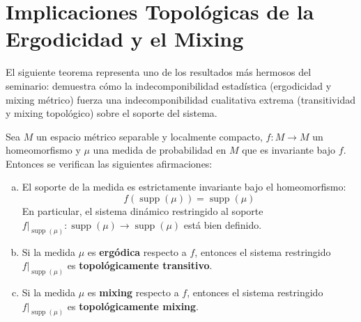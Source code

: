 \section{Implicaciones Topológicas de la Ergodicidad y el Mixing}

El siguiente teorema representa uno de los resultados más hermosos del seminario: demuestra cómo la indecomponibilidad estadística (ergodicidad y mixing métrico) fuerza una indecomponibilidad cualitativa extrema (transitividad y mixing topológico) sobre el soporte del sistema.

\begin{proposicion} \label{prop:dinamica_soporte}
	Sea $M$ un espacio métrico separable y localmente compacto, $f: M \to M$ un homeomorfismo y $\mu$ una medida de probabilidad en $M$ que es invariante bajo $f$. Entonces se verifican las siguientes afirmaciones:
	\begin{enumerate}[a)]
		\item El soporte de la medida es estrictamente invariante bajo el homeomorfismo:
		$$ f(\operatorname{supp}(\mu)) = \operatorname{supp}(\mu) $$
		En particular, el sistema dinámico restringido al soporte $f|_{\operatorname{supp}(\mu)}: \operatorname{supp}(\mu) \to \operatorname{supp}(\mu)$ está bien definido.
		\item Si la medida $\mu$ es \textbf{ergódica} respecto a $f$, entonces el sistema restringido $f|_{\operatorname{supp}(\mu)}$ es \textbf{topológicamente transitivo}.
		\item Si la medida $\mu$ es \textbf{mixing} respecto a $f$, entonces el sistema restringido $f|_{\operatorname{supp}(\mu)}$ es \textbf{topológicamente mixing}.
	\end{enumerate}
\end{proposicion}

